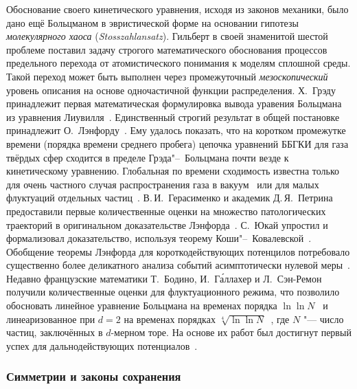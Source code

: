 Обоснование своего кинетического уравнения, исходя из законов механики, было дано ещё Больцманом в эвристической форме
на основании гипотезы \emph{молекулярного хаоса} (\emph{Stosszahlansatz}).
Гильберт в своей знаменитой шестой проблеме поставил задачу строгого математического обоснования
процессов предельного перехода от атомистического понимания к моделям сплошной среды.
Такой переход может быть выполнен через промежуточный \emph{мезоскопический} уровень описания
на основе одночастичной функции распределения.
Х.~Грэду принадлежит первая математическая формулировка вывода уравения Больцмана из уравнения Лиувилля~\cite{Grad1949}.
Единственный строгий результат в общей постановке принадлежит О.~Лэнфорду~\cite{Lanford1975}.
Ему удалось показать, что на коротком промежутке времени (порядка времени среднего пробега)
цепочка уравнений ББГКИ для газа твёрдых сфер сходится в пределе Грэда"--~Больцмана почти везде к кинетическому уравнению.
Глобальная по времени сходимость известна только для очень частного случая распространения газа в вакуум~\cite{Illner1989}
или для малых флуктуаций отдельных частиц~\cite{Beijeren1980}.
В.\,И.~Герасименко и академик Д.\,Я.~Петрина предоставили первые количественные оценки на множество патологических
траекторий в оригинальном доказательстве Лэнфорда~\cite{Petrina1990}.
С.~Юкай упростил и формализовал доказательство, используя теорему Коши"--~Ковалевской~\cite{Ukai2001}.
Обобщение теоремы Лэнфорда для короткодействующих потенцилов потребовало существенно более деликатного
анализа событий асимптотически нулевой меры~\cite{Raymond2013, Pulvirenti2014}.
Недавно французские математики Т.~Бодино, И.~Г\'{а}ллахер и Л.~Сэн-Ремон получили количественные оценки для флуктуационного режима,
что позволило обосновать линейное уравнение Больцмана на временах порядка \(\ln\ln{N}\)~\cite{Raymond2016}
и линеаризованное при \(d=2\) на временах порядках \(\sqrt[4]{\ln\ln{N}}\)~\cite{Raymond2017},
где \(N\) "--- число частиц, заключённых в \(d\)-мерном торе.
На основе их работ был достигнут первый успех для дальнодействующих потенциалов~\cite{Ayi2017}.

\subsubsection{Симметрии и законы сохранения}

